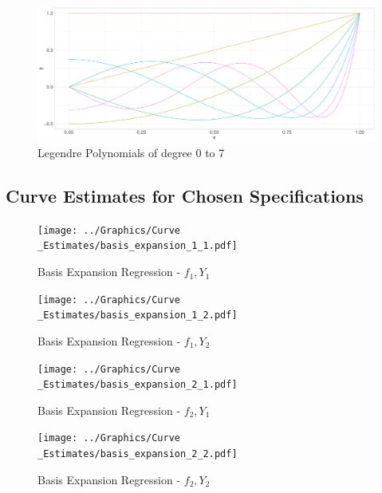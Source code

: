 \documentclass[11pt,twoside,a4paper]{article}
\begin{document}
	\begin{figure}[H]\label{Legendre_basis}
		\includegraphics[width = \textwidth]{../Graphics/Legendre_Plot.pdf}
		\caption{Legendre Polynomials of degree 0 to 7}
	\end{figure}


	
	\subsection{Curve Estimates for Chosen Specifications}
	
	\begin{figure}[H]
		\centering
		\begin{minipage}{.5\textwidth}
			\centering
			\texttt{[image: ../Graphics/Curve\\\_Estimates/basis\_expansion\_1\_1.pdf]}
			\caption{Basis Expansion Regression - $f_1, Y_1$}
		\end{minipage}%
		\begin{minipage}{.5\textwidth}
			\centering
			\texttt{[image: ../Graphics/Curve\\\_Estimates/basis\_expansion\_1\_2.pdf]}
			\caption{Basis Expansion Regression - $f_1, Y_2$}
		\end{minipage}
	\end{figure}
	
	\begin{figure}[H]
		\centering
		\begin{minipage}{.5\textwidth}
			\centering
			\texttt{[image: ../Graphics/Curve\\\_Estimates/basis\_expansion\_2\_1.pdf]}
			\caption{Basis Expansion Regression - $f_2, Y_1$}
		\end{minipage}%
		\begin{minipage}{.5\textwidth}
			\centering
			\texttt{[image: ../Graphics/Curve\\\_Estimates/basis\_expansion\_2\_2.pdf]}
			\caption{Basis Expansion Regression - $f_2, Y_2$}
		\end{minipage}
	\end{figure}
	
\end{document}
